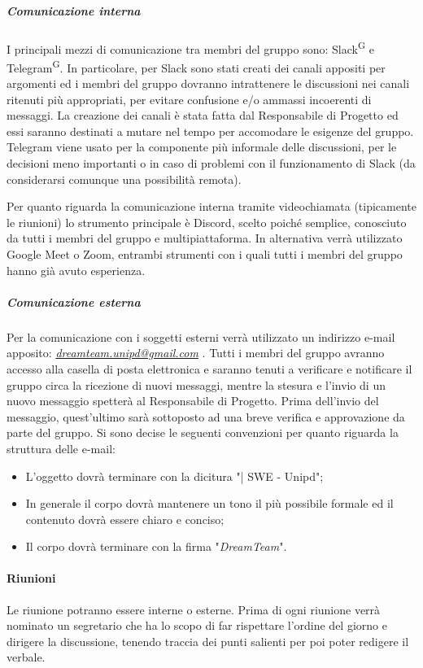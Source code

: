 \subparagraph{Comunicazione interna}
I principali mezzi di comunicazione tra membri del gruppo sono: Slack\textsuperscript{G} e Telegram\textsuperscript{G}. 
In particolare, per Slack sono stati creati dei canali appositi per argomenti ed i membri del gruppo dovranno intrattenere le discussioni nei canali ritenuti più appropriati, per evitare confusione e/o ammassi incoerenti di messaggi. La creazione dei canali è stata fatta dal Responsabile di Progetto ed essi saranno destinati a mutare nel tempo per accomodare le esigenze del gruppo.
Telegram viene usato per la componente più informale delle discussioni, per le decisioni meno importanti o in caso di problemi con il funzionamento di Slack (da considerarsi comunque una possibilità remota). 

Per quanto riguarda la comunicazione interna tramite videochiamata (tipicamente le riunioni) lo strumento principale è Discord, scelto poiché semplice, conosciuto da tutti i membri del gruppo e multipiattaforma. In alternativa verrà utilizzato Google Meet o Zoom, entrambi strumenti con i quali tutti i membri del gruppo hanno già avuto esperienza.

\subparagraph{Comunicazione esterna}
Per la comunicazione con i soggetti esterni verrà utilizzato un indirizzo e-mail apposito: \textsl{\href{mailto:dreamteam.unipd@gmail.com}{dreamteam.unipd@gmail.com}} .
Tutti i membri del gruppo avranno accesso alla casella di posta elettronica e saranno tenuti a verificare e notificare il gruppo circa la ricezione di nuovi messaggi, mentre la stesura e l'invio di un nuovo messaggio spetterà al Responsabile di Progetto. Prima dell'invio del messaggio, quest'ultimo sarà sottoposto ad una breve verifica e approvazione da parte del gruppo.
Si sono decise le seguenti convenzioni per quanto riguarda la struttura delle e-mail:
\begin{itemize}
\item L'oggetto dovrà terminare con la dicitura "| SWE - Unipd";
\item In generale il corpo dovrà mantenere un tono il più possibile formale ed il contenuto dovrà essere chiaro e conciso;
\item Il corpo dovrà terminare con la firma "\textit{DreamTeam}".
\end{itemize}

\paragraph{Riunioni}
Le riunione potranno essere interne o esterne. Prima di ogni riunione verrà nominato un segretario che ha lo scopo di far rispettare l'ordine del giorno e dirigere la discussione, tenendo traccia dei punti salienti per poi poter redigere il verbale.

